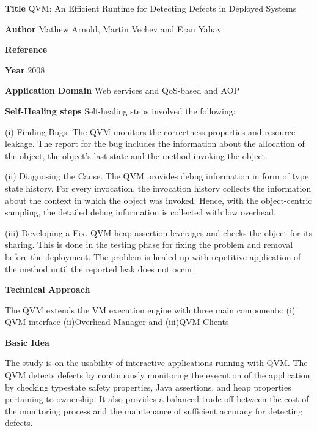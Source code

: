 \begin{compactitem}

\item[\textbf{Title}]QVM: An Efficient Runtime for Detecting Defects in Deployed Systems

\item[\textbf{Author}]
Mathew Arnold, Martin Vechev and Eran Yahav

\item[\textbf{Reference}] 

\cite{mathew_arnold_qvm:_2008}

\item[\textbf{Year}] 2008

\item[\textbf{Application Domain}]
Web services and QoS-based and AOP

\item[\textbf{Self-Healing steps}] Self-healing steps involved the following:

(i)	Finding Bugs.
The QVM monitors the correctness properties and resource leakage. The report for the bug includes the information about the allocation of the object, the object’s last state and the method invoking the object.

(ii)	Diagnosing the Cause.
The QVM provides debug information in form of type state history. For every invocation, the invocation history collects the information about the context in which the object was invoked. Hence, with the object-centric sampling, the detailed debug information is collected with low overhead.

(iii)	Developing a Fix.
QVM heap assertion leverages and checks the object for its sharing. This is done in the testing phase for fixing the problem and removal before the deployment. The problem is healed up with repetitive application of the method until the reported leak does not occur.    

\item[\textbf{Technical Approach}]

The QVM extends the VM execution engine with three main components: 
(i)	QVM interface
(ii)Overhead Manager and
(iii)QVM Clients 

\item[\textbf{Basic Idea}]  

The study is on the usability of interactive applications running with QVM. The QVM detects defects by continuously monitoring the execution of the application by checking typestate safety properties, Java assertions, and heap properties pertaining to ownership. It also provides a balanced trade-off between the cost of the monitoring process and the maintenance of sufficient accuracy for detecting defects.


\end{compactitem}
